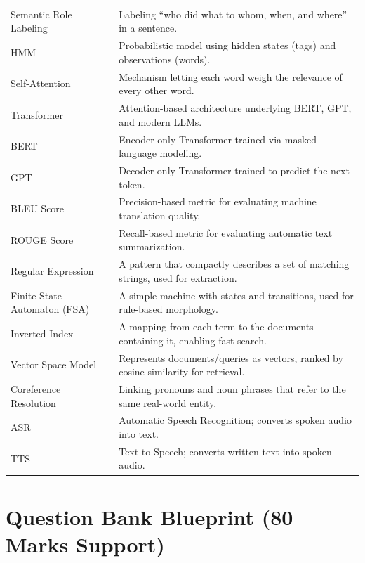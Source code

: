 \documentclass[11pt,a4paper]{article}
\begin{document}
\begin{longtable}{@{}p{3.3cm}p{10.2cm}@{}}
\addlinespace
Semantic Role Labeling & Labeling ``who did what to whom, when, and where'' in a sentence. \\
\addlinespace
HMM & Probabilistic model using hidden states (tags) and observations (words). \\
\addlinespace
Self-Attention & Mechanism letting each word weigh the relevance of every other word. \\
\addlinespace
Transformer & Attention-based architecture underlying BERT, GPT, and modern LLMs. \\
\addlinespace
BERT & Encoder-only Transformer trained via masked language modeling. \\
\addlinespace
GPT & Decoder-only Transformer trained to predict the next token. \\
\addlinespace
BLEU Score & Precision-based metric for evaluating machine translation quality. \\
\addlinespace
ROUGE Score & Recall-based metric for evaluating automatic text summarization. \\
\addlinespace
Regular Expression & A pattern that compactly describes a set of matching strings, used for extraction. \\
\addlinespace
Finite-State Automaton (FSA) & A simple machine with states and transitions, used for rule-based morphology. \\
\addlinespace
Inverted Index & A mapping from each term to the documents containing it, enabling fast search. \\
\addlinespace
Vector Space Model & Represents documents/queries as vectors, ranked by cosine similarity for retrieval. \\
\addlinespace
Coreference Resolution & Linking pronouns and noun phrases that refer to the same real-world entity. \\
\addlinespace
ASR & Automatic Speech Recognition; converts spoken audio into text. \\
\addlinespace
TTS & Text-to-Speech; converts written text into spoken audio. \\
\bottomrule
\end{longtable}

\section{Question Bank Blueprint (80 Marks Support)}
\end{document}
